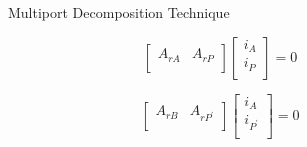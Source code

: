 \documentclass[12pt,psfig,a4]{article}
\begin{document}
\begin{figure}[ht]
{\centering {} \par}
\caption{Multiport Decomposition Technique}
\label{multi}
\end{figure}

\begin{equation}
\left[\begin{array}{ll}
A_{rA} & A_{rP}\\
\end{array}\right]
\left[\begin{array}{l}
i_{A} \\
i_{P}\\
\end{array}\right]
= 0
\end{equation}

\begin{equation}
\left[\begin{array}{ll}
A_{rB} & A_{rP^{'}}\\
\end{array}\right]
\left[\begin{array}{l}
i_{A} \\
i_{P^{'}}\\
\end{array}\right]
= 0
\end{equation}
\end{document}
